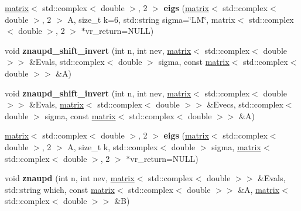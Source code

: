 \begin{DoxyCompactItemize}
\item 
\hypertarget{namespacekeycpp_a221e5a7364ba407f7a5201b66e7ae056}{\hyperlink{classkeycpp_1_1matrix}{matrix}$<$ std\-::complex$<$ double $>$, 2 $>$ {\bfseries eigs} (\hyperlink{classkeycpp_1_1matrix}{matrix}$<$ std\-::complex$<$ double $>$, 2 $>$ A, size\-\_\-t k=6, std\-::string sigma=\char`\"{}L\-M\char`\"{}, matrix$<$ std\-::complex$<$ double $>$, 2 $>$ $\ast$vr\-\_\-return=N\-U\-L\-L)}\label{namespacekeycpp_a221e5a7364ba407f7a5201b66e7ae056}

\item 
\hypertarget{namespacekeycpp_a82061266615ad24ba5b25324aae1cc12}{void {\bfseries znaupd\-\_\-shift\-\_\-invert} (int n, int nev, \hyperlink{classkeycpp_1_1matrix}{matrix}$<$ std\-::complex$<$ double $>$$>$ \&Evals, std\-::complex$<$ double $>$ sigma, const \hyperlink{classkeycpp_1_1matrix}{matrix}$<$ std\-::complex$<$ double $>$$>$ \&A)}\label{namespacekeycpp_a82061266615ad24ba5b25324aae1cc12}

\item 
\hypertarget{namespacekeycpp_ae57a4ddfa1c5ed22c8999a7cbb1daac2}{void {\bfseries znaupd\-\_\-shift\-\_\-invert} (int n, int nev, \hyperlink{classkeycpp_1_1matrix}{matrix}$<$ std\-::complex$<$ double $>$$>$ \&Evals, \hyperlink{classkeycpp_1_1matrix}{matrix}$<$ std\-::complex$<$ double $>$$>$ \&Evecs, std\-::complex$<$ double $>$ sigma, const \hyperlink{classkeycpp_1_1matrix}{matrix}$<$ std\-::complex$<$ double $>$$>$ \&A)}\label{namespacekeycpp_ae57a4ddfa1c5ed22c8999a7cbb1daac2}

\item 
\hypertarget{namespacekeycpp_a2f4ae58835279838a816efea3568e221}{\hyperlink{classkeycpp_1_1matrix}{matrix}$<$ std\-::complex$<$ double $>$, 2 $>$ {\bfseries eigs} (\hyperlink{classkeycpp_1_1matrix}{matrix}$<$ std\-::complex$<$ double $>$, 2 $>$ A, size\-\_\-t k, std\-::complex$<$ double $>$ sigma, \hyperlink{classkeycpp_1_1matrix}{matrix}$<$ std\-::complex$<$ double $>$, 2 $>$ $\ast$vr\-\_\-return=N\-U\-L\-L)}\label{namespacekeycpp_a2f4ae58835279838a816efea3568e221}

\item 
\hypertarget{namespacekeycpp_abee2fba02e36cee19c4731696b17db50}{void {\bfseries znaupd} (int n, int nev, \hyperlink{classkeycpp_1_1matrix}{matrix}$<$ std\-::complex$<$ double $>$$>$ \&Evals, std\-::string which, const \hyperlink{classkeycpp_1_1matrix}{matrix}$<$ std\-::complex$<$ double $>$$>$ \&A, \hyperlink{classkeycpp_1_1matrix}{matrix}$<$ std\-::complex$<$ double $>$$>$ \&B)}\label{namespacekeycpp_abee2fba02e36cee19c4731696b17db50}


\end{DoxyCompactItemize}
